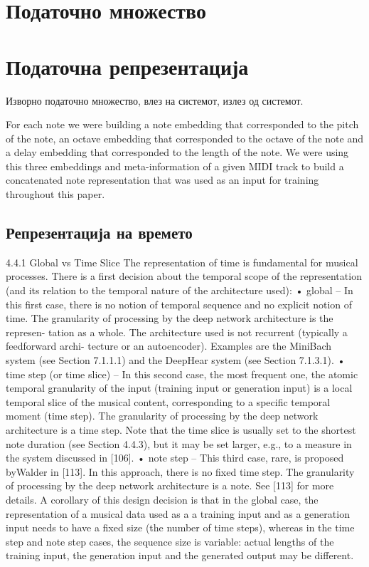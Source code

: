 \section{Податочно множество}

\section{Податочна репрезентација}

Изворно податочно множество, влез на системот, излез од системот. 

\cite{Tikhonov2017} For each note we were building a note embedding that corresponded to the pitch of the note, an octave embedding that corresponded to the octave of the note and a delay embedding that corresponded to the length of the note. We were using this three embeddings and meta-information of a given MIDI track to build a concatenated note representation that was used as an input for training throughout this paper.

\subsection{Репрезентација на времето}
4.4.1 Global vs Time Slice
The representation of time is fundamental for musical processes. There is a first decision about the temporal scope of the representation (and its relation to the temporal nature of the architecture used):
• global – In this first case, there is no notion of temporal sequence and no explicit notion of time. The granularity of processing by the deep network architecture is the represen-
tation as a whole. The architecture used is not recurrent (typically a feedforward archi- tecture or an autoencoder). Examples are the MiniBach system (see Section 7.1.1.1) and the DeepHear system (see Section 7.1.3.1).
• time step (or time slice) – In this second case, the most frequent one, the atomic temporal granularity of the input (training input or generation input) is a local temporal slice
of the musical content, corresponding to a specific temporal moment (time step). The granularity of processing by the deep network architecture is a time step. Note that the time slice is usually set to the shortest note duration (see Section 4.4.3), but it may be set larger, e.g., to a measure in the system discussed in [106].
• note step – This third case, rare, is proposed byWalder in [113]. In this approach, there is no fixed time step. The granularity of processing by the deep network architecture is
a note. See [113] for more details. A corollary of this design decision is that in the global case, the representation of a
musical data used as a a training input and as a generation input needs to have a fixed size (the number of time steps), whereas in the time step and note step cases, the sequence size is variable: actual lengths of the training input, the generation input and the generated output may be different.

